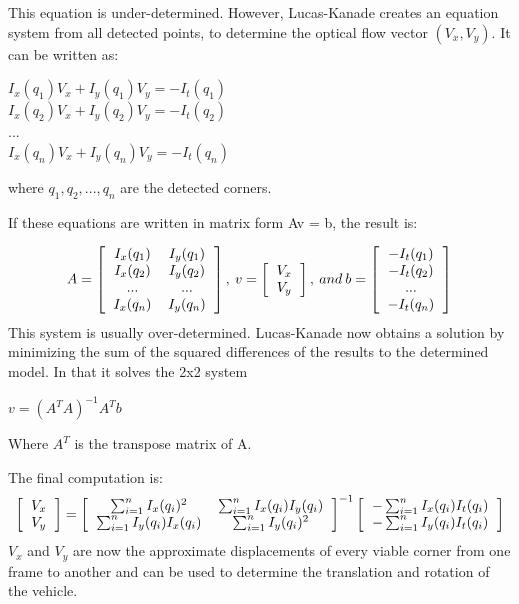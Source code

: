 This equation is under-determined. However, Lucas-Kanade creates an equation system from all detected points, to determine the optical flow vector $(V_x, V_y)$. It can be written as: 

\begin{center}
\large
$I_x(q_1) V_x + I_y(q_1) V_y = -I_t(q_1)$\\
$I_x(q_2) V_x + I_y(q_2) V_y = -I_t(q_2)$\\
...\\
$I_x(q_n) V_x + I_y(q_n) V_y = -I_t(q_n)$
\normalsize
\end{center}

where $q_1, q_2, ..., q_n$ are the detected corners.

If these equations are written in matrix form Av = b, the result is: 

\[ 
A=
\left[
  \begin{tabular}{cc}
  $I_x(q_1)$ & $I_y(q_1)$ \\
  $I_x(q_2)$ & $I_y(q_2)$ \\
  ... & ... \\
  $I_x(q_n)$ & $I_y(q_n)$ \\
  \end{tabular}
\right],\:
v =
\left[
	\begin{tabular}{c}
	$V_x$\\
	$V_y$
	\end{tabular}
\right],\:
and\: b = 
\left[
	\begin{tabular}{c}
	$-I_t(q_1)$\\
	$-I_t(q_2)$\\
	...\\
	$-I_t(q_n)$\\
	\end{tabular}
\right]
\]
This system is usually over-determined. Lucas-Kanade now obtains a solution by minimizing the sum of the squared differences of the results to the determined model.
In that it solves the 2x2 system

	$v = (A^T A)^{-1} A^T b$

Where $A^T$ is the transpose matrix of A.

The final computation is:
\[
\left[
\begin{tabular}{c}
	$V_x$ \\
	$V_y$
\end{tabular}
\right]
= 
\left[
\begin{tabular}{cc}
	$\sum_{i = 1}^n I_x(q_i)^2$ & $\sum_{i = 1}^n I_x(q_i) I_y(q_i)$ \\
	$\sum_{i = 1}^n I_y(q_i) I_x(q_i)$ & $\sum_{i = 1}^n I_y(q_i)^2$
\end{tabular}
\right]
^{-1}
\left[
\begin{tabular}{c}
	$- \sum_{i = 1}^n I_x(q_i) I_t(q_i)$ \\
	$- \sum_{i = 1}^n I_y(q_i) I_t(q_i)$ 
\end{tabular}
\right]
\]
$V_x$ and $V_y$ are now the approximate displacements of every viable corner from one frame to another and can be used to determine the translation and rotation of the vehicle.

